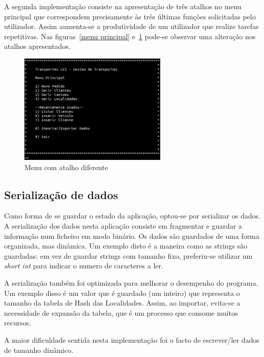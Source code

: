 \documentclass[a5paper,twocolumn, 11pt]{article}
\begin{document}
A segunda implementação consiste na apresentação de três atalhos no menu principal que correspondem precisamente às três últimas funções solicitadas pelo utilizador. Assim aumenta-se a produtividade de um utilizador que realize tarefas repetitivas.
Nas figuras~\ref{menu principal} e~\ref{menu principal com atalho diferente} pode-se observar uma alteração nos atalhos apresentados.
\begin{figure}[hbt]
    \caption[Menu Principal (atalho)]{Menu com atalho diferente}
    \label{menu principal com atalho diferente}
    \centering
        \includegraphics[width=200pt]{menu_com_atalho_diferente.png}
\end{figure}

\clearpage
\subsection[Serialização]{Serialização de dados}
Como forma de se guardar o estado da aplicação, optou-se por serializar os dados. A serialização dos dados nesta aplicação consiste em fragmentar e guardar a informação num ficheiro em modo binário. Os dados são guardados de uma forma organizada, mas dinâmica. Um exemplo disto é a maneira como as strings são guardadas: em vez de guardar strings com tamanho fixo, preferiu-se utilizar um \emph{short int} para indicar o numero de caracteres a ler.

A serialização também foi optimizada para melhorar o desempenho do programa. Um exemplo disso é um valor que é guardado (um inteiro) que representa o tamanho da tabela de Hash das Localidades. Assim, ao importar, evita-se a necessidade de expansão da tabela, que é um processo que consome muitos recursos.

A maior dificuldade sentida nesta implementação foi o facto de escrever/ler dados de tamanho dinâmico.

\clearpage
\end{document}
